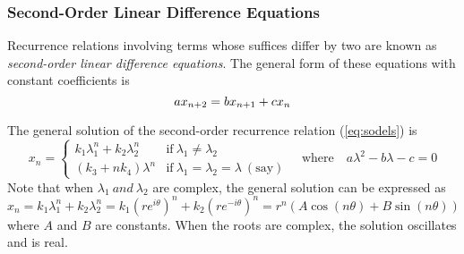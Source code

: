 \subsubsection{Second-Order Linear Difference Equations}
Recurrence relations involving terms whose suffices differ by two are known as \emph{second-order linear difference equations}.
The general form of these equations with constant coefficients is
\begin{equation}{\label{eq:sodels}}
	ax_{n+2}=bx_{n+1}+cx_n
\end{equation}
\begin{theorem}
	The general solution of the second-order recurrence relation (\ref{eq:sodels}) is
	\begin{equation}
		x_n=
		\begin{cases}
			k_1\lambda_1^n+k_2\lambda_2^n& \text{if}\ \lambda_1\neq\lambda_2\\
			(k_3+nk_4)\lambda^n& \text{if}\ \lambda_1=\lambda_2=\lambda\ (\text{say})
		\end{cases}\quad\text{where}\quad a\lambda^2-b\lambda-c=0
	\end{equation}
	Note that when $\lambda_1\ and\ \lambda_2$ are complex, the general solution can be expressed as
	\begin{equation}
		x_n=k_1\lambda_1^n+k_2\lambda_2^n=k_1(re^{i\theta})^n+k_2(re^{-i\theta})^n=r^n(A\cos(n\theta)+B\sin(n\theta))
	\end{equation}
	where $A$ and $B$ are constants.
	When the roots are complex, the solution oscillates and is real.
\end{theorem}